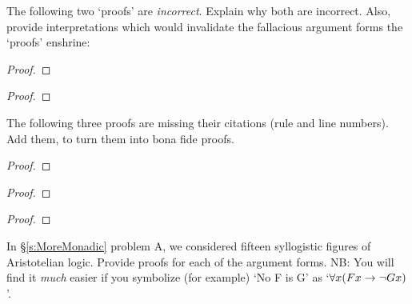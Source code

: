 \practiceproblems
\problempart
The following two `proofs' are \emph{incorrect}. Explain why both are incorrect. Also, provide interpretations which would invalidate the fallacious argument forms the `proofs' enshrine:
\begin{multicols}{2}
	\begin{proof}
	\end{proof}
	\begin{proof}
		\open
		\close
	\end{proof}
\end{multicols}

\problempart 
\label{pr.justifyFOLproof}
The following three proofs are missing their citations (rule and line numbers). Add them, to turn them into bona fide proofs. 
\begin{proof}
	\open
	\close
{} {}
\end{proof}
\begin{multicols}{2}
\begin{proof}
 {}
 {}
\end{proof}
\begin{proof}
\open
\close
{}
\end{proof}
\end{multicols}


\problempart
\label{pr.BarbaraEtc.proof1}
In \S\ref{s:MoreMonadic} problem A, we considered fifteen syllogistic figures of Aristotelian logic. Provide proofs for each of the argument forms. NB: You will find it \emph{much} easier if you symbolize (for example) `No F is G' as `$\forall x (Fx \rightarrow \neg Gx)$'.

